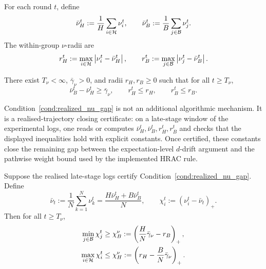 \begin{definition}
\label{def:active_group_stats}
For each round \(t\), define
\[
    \bar\nu_H^t := \frac1H\sum_{i\in\mathcal{H}}\nu_i^t,
    \qquad
    \bar\nu_B^t := \frac1B\sum_{j\in\mathcal{B}}\nu_j^t.
\]
The within-group \(\nu\)-radii are
\[
    r_H^t := \max_{i\in\mathcal{H}}\left\lvert \nu_i^t-\bar\nu_H^t \right\rvert,
    \qquad
    r_B^t := \max_{j\in\mathcal{B}}\left\lvert \nu_j^t-\bar\nu_B^t \right\rvert.
\]
\end{definition}

\begin{condition}
\label{cond:realized_nu_gap}
There exist \(T_\nu<\infty\), \(\bar\gamma_\nu>0\), and radii
\(r_H,r_B\ge 0\) such that for all \(t\ge T_\nu\),
\begin{equation}
    \bar\nu_B^t-\bar\nu_H^t \ge \bar\gamma_\nu,
    \qquad
    r_H^t\le r_H,
    \qquad
    r_B^t\le r_B.
    \label{eq:active_eventual_mean_nu_gap}
\end{equation}
\end{condition}

\begin{remark}
\label{rem:logged_closing_certificate}
Condition~\ref{cond:realized_nu_gap} is not an additional algorithmic
mechanism. It is a realised-trajectory closing certificate: on a late-stage
window of the experimental logs, one reads or computes
\(\bar\nu_H^t,\bar\nu_B^t,r_H^t,r_B^t\) and checks that the displayed
inequalities hold with explicit constants. Once certified, these constants
close the remaining gap between the expectation-level \(d\)-drift argument and
the pathwise weight bound used by the implemented HRAC rule.
\end{remark}

\begin{proposition}
\label{prop:active_nu_to_score_gap}
Suppose the realised late-stage logs certify
Condition~\ref{cond:realized_nu_gap}. Define
\[
    \bar\nu_t := \frac1N\sum_{k=1}^N\nu_k^t
    =
    \frac{H\bar\nu_H^t+B\bar\nu_B^t}{N},
    \qquad
    \chi_i^t:=(\nu_i^t-\bar\nu_t)_+.
\]
Then for all \(t\ge T_\nu\),
\begin{align}
    \min_{j\in\mathcal{B}}\chi_j^t
    &\ge
    \chi_B^\nu
    :=
    \left(\frac{H}{N}\bar\gamma_\nu-r_B\right)_+,
    \label{eq:chiB_from_nu}\\
    \max_{i\in\mathcal{H}}\chi_i^t
    &\le
    \chi_H^\nu
    :=
    \left(r_H-\frac{B}{N}\bar\gamma_\nu\right)_+.
    \label{eq:chiH_from_nu}
\end{align}
\end{proposition}

